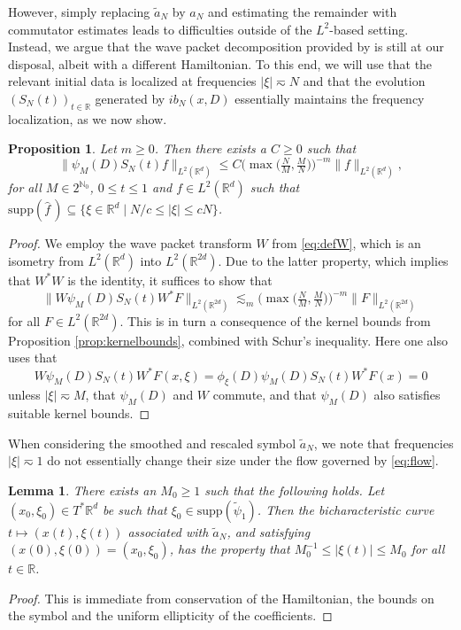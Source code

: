 \documentclass{amsart}
\numberwithin{equation}{section}
\newtheorem{lemma}[theorem]{Lemma}
\newtheorem{proposition}[theorem]{Proposition}
\theoremstyle{definition}
\newcommand{\R}{\mathbb{R}}
\newcommand{\Rd}{\mathbb{R}^{d}}
\newcommand{\N}{\mathbb{N}}
\newcommand {\supp}{\mathrm{supp}}
\newcommand {\wh}{\widehat}
\begin{document}
However, simply replacing $\tilde{a}_N$ by $a_{N}$ and estimating the remainder with commutator estimates leads to difficulties outside of the $L^{2}$-based setting. 
Instead, we argue that the wave packet decomposition provided by \cite{SchippaTataru2025} %
is still at our disposal, albeit with a different Hamiltonian. To this end, we will use that %
 the relevant initial data is localized at frequencies $|\xi| \eqsim N$ %
and that the evolution $(S_{N}(t))_{t\in\R}$ generated by $i b_N(x,D)$ essentially maintains the frequency localization, as we now show. 
\begin{proposition}
\label{prop:ModifiedEnergy}
Let $m\geq0$. Then there exists a $C\geq0$ such that
\begin{equation}
\label{eq:ModifiedEnergyEstimate}
\| \psi_{M}(D)S_{N}(t)f \|_{L^{2}(\Rd)} \leq C \big(\max\big(\tfrac{N}{M},\tfrac{M}{N}\big)\big)^{-m} \|f\|_{L^{2}(\Rd)},
\end{equation}
for all $M\in 2^{\N_{0}}$, $0\leq t\leq 1$ and $f\in L^{2}(\Rd)$ such that $\supp(\wh{f}\,)\subseteq\{\xi\in\Rd\mid N/c\leq |\xi|\leq cN\}$. \end{proposition}
\begin{proof}
We employ the wave packet transform $W$ from \eqref{eq:defW}, which is an isometry from $L^{2}(\Rd)$ into $L^{2}(\R^{2d})$. Due to the latter property, which implies that $W^{*}W$ is the identity, it suffices to show that 
\[
\|W\psi_{M}(D)S_{N}(t)W^{*}F\|_{L^{2}(\R^{2d})} \lesssim_{m} \big(\max\big(\tfrac{N}{M},\tfrac{M}{N}\big)\big)^{-m} \|F\|_{L^{2}(\R^{2d})}
\]
for all $F\in L^{2}(\R^{2d})$. This is in turn a consequence of the kernel bounds from Proposition \ref{prop:kernelbounds}, combined with Schur's inequality. Here one also uses that 
\[
W\psi_{M}(D)S_{N}(t)W^{*}F(x,\xi)=\phi_{\xi}(D)\psi_{M}(D)S_{N}(t)W^{*}F(x)=0
\]
unless $|\xi|\eqsim M$, that $\psi_{M}(D)$ and $W$ commute, and that $\psi_{M}(D)$ also satisfies  suitable kernel bounds.
\end{proof}

When considering the smoothed and rescaled symbol $\tilde{a}_N$, we note that frequencies $|\xi| \eqsim 1 $ do not essentially change their size under the flow governed by \eqref{eq:flow}.

\begin{lemma}\label{lem:conservationclassical}
There exists an $M_{0}\geq1$ such that the following holds. %
Let $(x_{0},\xi_0)\in T^{*}\Rd$ be such that $\xi_{0}\in \supp(\tilde{\psi}_1)$. Then the bicharacteristic curve $t\mapsto (x(t),\xi(t))$ associated with $\tilde{a}_N$, and satisfying $(x(0),\xi(0))=(x_0,\xi_0)$, %
has the property that $M_{0}^{-1}\leq |\xi(t)|\leq M_{0}$ for all $t\in\R$.
\end{lemma}
\begin{proof}
    This is immediate from conservation of the Hamiltonian, the bounds on the symbol and the uniform ellipticity of the coefficients.
\end{proof}
\end{document}

